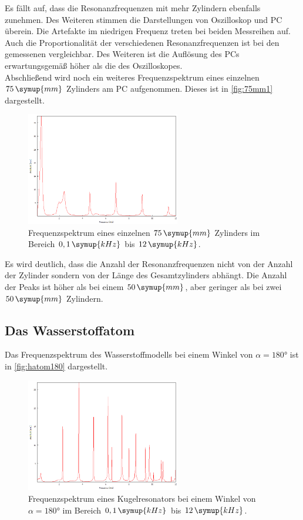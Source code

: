 Es fällt auf, dass die Resonanzfrequenzen mit mehr Zylindern ebenfalls zunehmen. Des Weiteren stimmen die 
Darstellungen von Oszilloskop und PC überein. Die Artefakte im niedrigen Frequenz treten bei beiden
Messreihen auf. Auch die Proportionalität der verschiedenen Resonanzfrequenzen ist bei den gemessenen
vergleichbar. Des Weiteren ist die Auflösung des PCs erwartungsgemäß höher als die des Oszilloskopes.\\
Abschließend wird noch ein weiteres Frequenzspektrum eines einzelnen $75 \, \symup{mm}$ Zylinders am PC aufgenommen.
Dieses ist in \autoref{fig:75mm1} dargestellt.
\begin{figure}[h]
    \centering
    \includegraphics[width=0.6\textwidth]{data/1_3_zylinder75mm/1.png}
    \caption{Frequenzspektrum eines einzelnen $75 \, \symup{mm}$ Zylinders im Bereich $0,1 \, \symup{kHz}$ bis $12 \, \symup{kHz}$.}
    \label{fig:75mm1}
\end{figure}
Es wird deutlich, dass die Anzahl der Resonanzfrequenzen nicht von der Anzahl der Zylinder sondern 
von der Länge des Gesamtzylinders abhängt. Die Anzahl der Peaks ist höher als bei einem $50 \, \symup{mm}$,
aber geringer als bei zwei $50 \, \symup{mm}$ Zylindern.

\subsection{Das Wasserstoffatom}
Das Frequenzspektrum des Wasserstoffmodells bei einem Winkel von $\alpha = 180°$ ist in \autoref{fig:hatom180}
dargestellt.
\begin{figure}[h]
    \centering
    \includegraphics[width=0.6\textwidth]{data/2_1/180.png}
    \caption{Frequenzspektrum eines Kugelresonators bei einem Winkel von $\alpha = 180°$ im Bereich $0,1 \, \symup{kHz}$ bis $12 \, \symup{kHz}$.}
    \label{fig:hatom180}
\end{figure}

